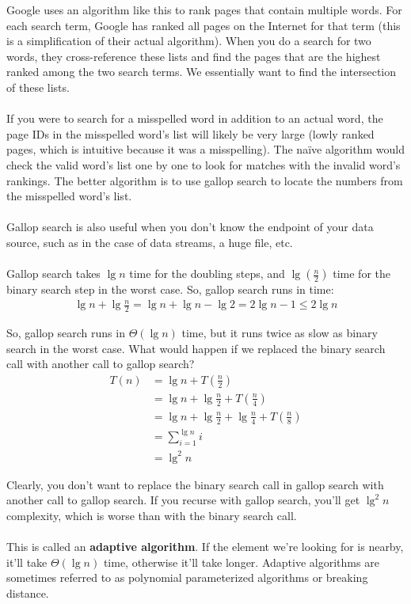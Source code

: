 \documentclass[]{article}
\theoremstyle{definition}
\begin{document}
			Google uses an algorithm like this to rank pages that contain multiple words. For each search term, Google has ranked all pages on the Internet for that term (this is a simplification of their actual algorithm). When you do a search for two words, they cross-reference these lists and find the pages that are the highest ranked among the two search terms. We essentially want to find the intersection of these lists.
			\\ \\
			If you were to search for a misspelled word in addition to an actual word, the page IDs in the misspelled word's list will likely be very large (lowly ranked pages, which is intuitive because it was a misspelling). The na\"ive algorithm would check the valid word's list one by one to look for matches with the invalid word's rankings. The better algorithm is to use gallop search to locate the numbers from the misspelled word's list.
			\\ \\
			Gallop search is also useful when you don't know the endpoint of your data source, such as in the case of data streams, a huge file, etc.
			\\ \\
			Gallop search takes $\lg n$ time for the doubling steps, and $\lg \left( \frac{n}{2} \right)$ time for the binary search step in the worst case. So, gallop search runs in time:
			\begin{align*}
				\lg n + \lg \frac{n}{2} = \lg n + \lg n - \lg 2 = 2 \lg n - 1 \le 2 \lg n
			\end{align*}

			So, gallop search runs in $\Theta(\lg n)$ time, but it runs twice as slow as binary search in the worst case. What would happen if we replaced the binary search call with another call to gallop search?
			\begin{align*}
				T(n) &= \lg n + T \left( \frac{n}{2} \right) \\
				&= \lg n + \lg \frac{n}{2} + T \left( \frac{n}{4} \right) \\
				&= \lg n + \lg \frac{n}{2} + \lg \frac{n}{4} + T \left( \frac{n}{8} \right) \\
				&= \sum_{i = 1}^{\lg n} i \\
				&= \lg^2 n
			\end{align*}

			Clearly, you don't want to replace the binary search call in gallop search with another call to gallop search. If you recurse with gallop search, you'll get $\lg^2 n$ complexity, which is worse than with the binary search call.
			\\ \\
			This is called an \textbf{adaptive algorithm}. If the element we're looking for is nearby, it'll take $\Theta(\lg n)$ time, otherwise it'll take longer. Adaptive algorithms are sometimes referred to as polynomial parameterized algorithms or breaking distance.
\end{document}
